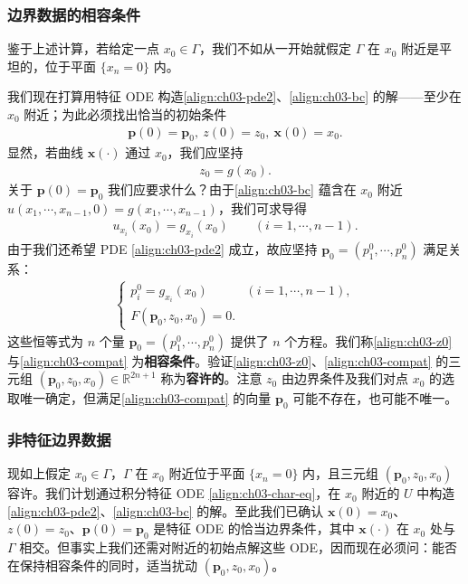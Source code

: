 \documentclass[../../main.tex]{subfiles}
\begin{document}
\subsubsection{边界数据的相容条件}

鉴于上述计算，若给定一点 $x_0\in\Gamma$，我们不如从一开始就假定 $\Gamma$ 在 $x_0$ 附近是平坦的，位于平面 $\{x_n=0\}$ 内。

我们现在打算用特征 ODE 构造\eqref{align:ch03-pde2}、\eqref{align:ch03-bc} 的解——至少在 $x_0$ 附近；为此必须找出恰当的初始条件
\begin{align}\label{align:ch03-initial}
\mathbf{p}(0)=\mathbf{p}_0,\ z(0)=z_0,\ \mathbf{x}(0)=x_0.
\end{align}
显然，若曲线 $\mathbf{x}(\cdot)$ 通过 $x_0$，我们应坚持
\begin{align}\label{align:ch03-z0}
z_0=g(x_0).
\end{align}
关于 $\mathbf{p}(0)=\mathbf{p}_0$ 我们应要求什么？由于\eqref{align:ch03-bc} 蕴含在 $x_0$ 附近 $u(x_1,\cdots,x_{n-1},0)=g(x_1,\cdots,x_{n-1})$，我们可求导得
\begin{align*}
u_{x_i}(x_0)=g_{x_i}(x_0) \qquad (i=1,\cdots,n-1).
\end{align*}
由于我们还希望 PDE \eqref{align:ch03-pde2} 成立，故应坚持 $\mathbf{p}_0=(p_1^0,\cdots,p_n^0)$ 满足关系：
\begin{align}\label{align:ch03-compat}
\begin{cases}
p_i^0=g_{x_i}(x_0) & (i=1,\cdots,n-1),\\
F(\mathbf{p}_0,z_0,x_0)=0.
\end{cases}
\end{align}
这些恒等式为 $n$ 个量 $\mathbf{p}_0=(p_1^0,\cdots,p_n^0)$ 提供了 $n$ 个方程。我们称\eqref{align:ch03-z0} 与\eqref{align:ch03-compat} 为\textbf{相容条件}。验证\eqref{align:ch03-z0}、\eqref{align:ch03-compat} 的三元组 $(\mathbf{p}_0,z_0,x_0)\in\mathbb{R}^{2n+1}$ 称为\textbf{容许的}。注意 $z_0$ 由边界条件及我们对点 $x_0$ 的选取唯一确定，但满足\eqref{align:ch03-compat} 的向量 $\mathbf{p}_0$ 可能不存在，也可能不唯一。

\subsubsection{非特征边界数据}

现如上假定 $x_0\in\Gamma$，$\Gamma$ 在 $x_0$ 附近位于平面 $\{x_n=0\}$ 内，且三元组 $(\mathbf{p}_0,z_0,x_0)$ 容许。我们计划通过积分特征 ODE \eqref{align:ch03-char-eq}，在 $x_0$ 附近的 $U$ 中构造\eqref{align:ch03-pde2}、\eqref{align:ch03-bc} 的解。至此我们已确认 $\mathbf{x}(0)=x_0$、$z(0)=z_0$、$\mathbf{p}(0)=\mathbf{p}_0$ 是特征 ODE 的恰当边界条件，其中 $\mathbf{x}(\cdot)$ 在 $x_0$ 处与 $\Gamma$ 相交。但事实上我们还需对附近的初始点解这些 ODE，因而现在必须问：能否在保持相容条件的同时，适当扰动 $(\mathbf{p}_0,z_0,x_0)$。
\end{document}
